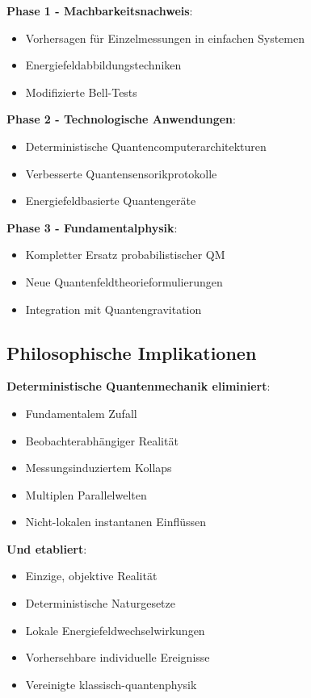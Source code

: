 \documentclass[12pt,a4paper]{article}
\begin{document}
			\textbf{Phase 1 - Machbarkeitsnachweis}:
			\begin{itemize}
				\item Vorhersagen für Einzelmessungen in einfachen Systemen
				\item Energiefeldabbildungstechniken
				\item Modifizierte Bell-Tests
			\end{itemize}
			
			\textbf{Phase 2 - Technologische Anwendungen}:
			\begin{itemize}
				\item Deterministische Quantencomputerarchitekturen
				\item Verbesserte Quantensensorikprotokolle
				\item Energiefeldbasierte Quantengeräte
			\end{itemize}
			
			\textbf{Phase 3 - Fundamentalphysik}:
			\begin{itemize}
				\item Kompletter Ersatz probabilistischer QM
				\item Neue Quantenfeldtheorieformulierungen
				\item Integration mit Quantengravitation
			\end{itemize}
			
			\subsection{Philosophische Implikationen}
			
			\begin{tcolorbox}[colback=purple!5!white,colframe=purple!75!black,title=Das Ende der Quantenmystik]
				\textbf{Deterministische Quantenmechanik eliminiert}:
				\begin{itemize}
					\item Fundamentalem Zufall
					\item Beobachterabhängiger Realität
					\item Messungsinduziertem Kollaps
					\item Multiplen Parallelwelten
					\item Nicht-lokalen instantanen Einflüssen
				\end{itemize}
				
				\textbf{Und etabliert}:
				\begin{itemize}
					\item Einzige, objektive Realität
					\item Deterministische Naturgesetze
					\item Lokale Energiefeldwechselwirkungen
					\item Vorhersehbare individuelle Ereignisse
					\item Vereinigte klassisch-quantenphysik
				\end{itemize}
			\end{tcolorbox}
			
\end{document}
